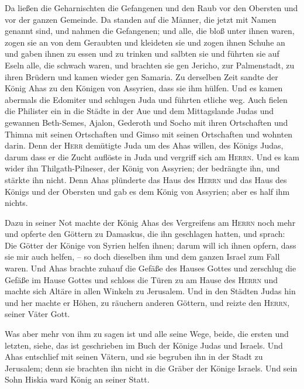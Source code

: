 Da ließen die Geharnischten die Gefangenen und den Raub
vor den Obersten und vor der ganzen Gemeinde.  Da standen
auf die Männer, die jetzt mit Namen genannt sind, und nahmen die
Gefangenen; und alle, die bloß unter ihnen waren, zogen sie an von dem
Geraubten und kleideten sie und zogen ihnen Schuhe an und gaben ihnen zu
essen und zu trinken und salbten sie und führten sie auf Eseln alle, die
schwach waren, und brachten sie gen Jericho, zur Palmenstadt, zu ihren
Brüdern und kamen wieder gen Samaria.  Zu derselben Zeit
sandte der König Ahas zu den Königen von Assyrien, dass sie ihm hülfen.
 Und es kamen abermals die Edomiter und schlugen Juda und
führten etliche weg.  Auch fielen die Philister ein in
die Städte in der Aue und dem Mittagslande Judas und gewannen
Beth-Semes, Ajalon, Gederoth und Socho mit ihren Ortschaften und Thimna
mit seinen Ortschaften und Gimso mit seinen Ortschaften und wohnten
darin.  Denn der \textsc{Herr} demütigte Juda um des Ahas
willen, des Königs Judas, darum dass er die Zucht auflöste in Juda und
vergriff sich am \textsc{Herrn}.  Und es kam wider ihn
Thilgath-Pilneser, der König von Assyrien; der bedrängte ihn, und
stärkte ihn nicht.  Denn Ahas plünderte das Haus des
\textsc{Herrn} und das Haus des Königs und der Obersten und gab es dem
König von Assyrien; aber es half ihm nichts.

 Dazu in seiner Not machte der König Ahas des Vergreifens
am \textsc{Herrn} noch mehr  und opferte den Göttern zu
Damaskus, die ihn geschlagen hatten, und sprach: Die Götter der Könige
von Syrien helfen ihnen; darum will ich ihnen opfern, dass sie mir auch
helfen, -- so doch dieselben ihm und dem ganzen Israel zum Fall waren.
 Und Ahas brachte zuhauf die Gefäße des Hauses Gottes und
zerschlug die Gefäße im Hause Gottes und schloss die Türen zu am Hause
des \textsc{Herrn} und machte sich Altäre in allen Winkeln zu Jerusalem.
 Und in den Städten Judas hin und her machte er Höhen, zu
räuchern anderen Göttern, und reizte den \textsc{Herrn}, seiner Väter
Gott.

 Was aber mehr von ihm zu sagen ist und alle seine Wege,
beide, die ersten und letzten, siehe, das ist geschrieben im Buch der
Könige Judas und Israels.  Und Ahas entschlief mit seinen
Vätern, und sie begruben ihn in der Stadt zu Jerusalem; denn sie
brachten ihn nicht in die Gräber der Könige Israels. Und sein Sohn
Hiskia ward König an seiner Statt.

